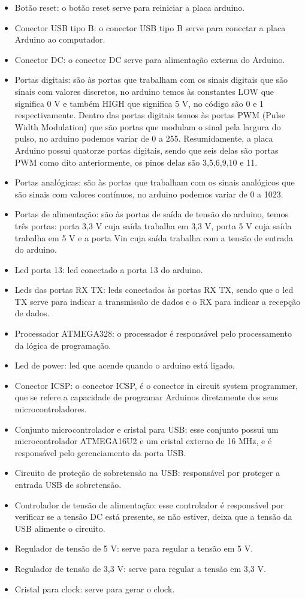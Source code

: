 \begin{itemize}
\item Botão reset: o botão reset serve para reiniciar a placa arduino.
\item Conector USB tipo B: o conector USB tipo B serve para conectar a placa Arduino ao computador.
\item Conector DC: o conector DC serve para alimentação externa do Arduino.
\item Portas digitais: são às portas que trabalham com os sinais digitais que são sinais com valores discretos, no arduino temos às constantes LOW que significa 0 V e também HIGH que significa 5 V, no código são 0 e 1 respectivamente. Dentro das portas digitais temos às portas PWM (Pulse Width Modulation) que são portas que modulam o sinal pela largura do pulso, no arduino podemos variar de 0 a 255. Resumidamente, a placa Arduino possui quatorze portas digitais, sendo que seis delas são portas PWM como dito anteriormente, os pinos delas são 3,5,6,9,10 e 11.
\item Portas analógicas: são às portas que trabalham com os sinais analógicos que são sinais com valores contínuos, no arduino podemos variar de 0 a 1023.
\item Portas de alimentação: são às portas de saída de tensão do arduino, temos três portas: porta 3,3 V cuja saída trabalha em 3,3 V, porta 5 V cuja saída trabalha em 5 V e a porta Vin cuja saída trabalha com a tensão de entrada do arduino.
\item Led porta 13: led conectado a porta 13 do arduino.
\item Leds das portas RX TX: leds conectados às portas RX TX, sendo que o led TX serve para indicar a transmissão de dados e o RX para indicar a recepção de dados.
\item Processador ATMEGA328: o processador é responsável pelo processamento da lógica de programação.
\item Led de power: led que acende quando o arduino está ligado.
\item Conector ICSP: o conector ICSP, é o conector in circuit system programmer, que se refere a capacidade de programar Arduinos diretamente dos seus microcontroladores. 
\item Conjunto microcontrolador e cristal para USB: esse conjunto possui um microcontrolador ATMEGA16U2 e um cristal externo de 16 MHz, e é responsável pelo gerenciamento da porta USB.
\item Circuito de proteção de sobretensão na USB: responsável por proteger a entrada USB de sobretensão.
\item Controlador de tensão de alimentação: esse controlador é responsável por verificar se a tensão DC está presente, se não estiver, deixa que a tensão da USB alimente o circuito. 
\item Regulador de tensão de 5 V: serve para regular a tensão em 5 V.
\item Regulador de tensão de 3,3 V: serve para regular a tensão em 3,3 V.
\item Cristal para clock: serve para gerar o clock.
\end{itemize}


